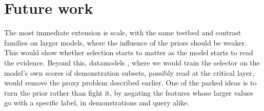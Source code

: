 \section{Future work}
The most immediate extension is scale, with the same testbed and contrast families on larger models, where the influence of the priors should be weaker. This would show whether selection starts to matter as the model starts to read the evidence. Beyond this, datamodels \citep{ilyas2022datamodels,chang2023data}, where we would train the selector on the model's own scores of demonstration subsets, possibly read at the critical layer, would remove the proxy problem described earlier. One of the parked ideas is to turn the prior rather than fight it, by negating the features whose larger values go with a specific label, in demonstrations and query alike.
